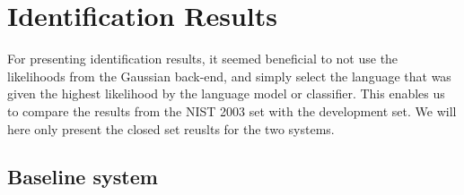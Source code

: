 \chapter{Identification Results}

For presenting identification results, it seemed beneficial to not use the likelihoods from the Gaussian back-end, and simply select the language that was given the highest likelihood by the language model or classifier. This enables us to compare the results from the NIST 2003 set with the development set. We will here only present the closed set reuslts for the two systems.

\section{Baseline system}

